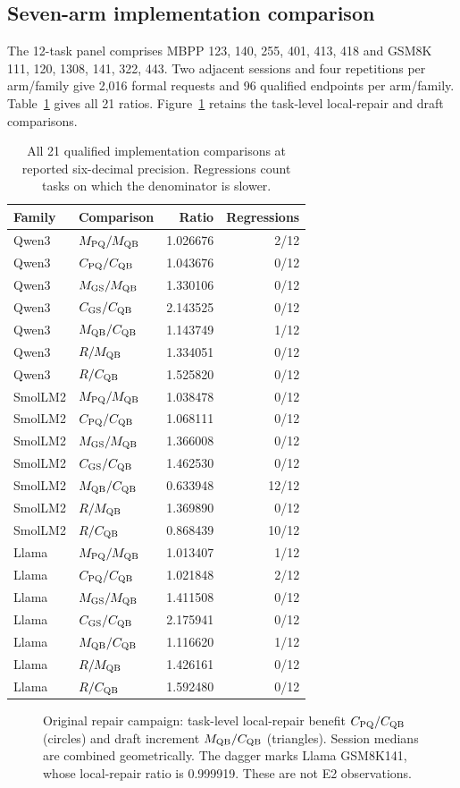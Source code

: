 \subsection{Seven-arm implementation comparison}
The 12-task panel comprises MBPP 123, 140, 255, 401, 413, 418 and GSM8K 111, 120, 1308, 141, 322, 443. Two adjacent sessions and four repetitions per arm/family give 2,016 formal requests and 96 qualified endpoints per arm/family. Table~\ref{tab:allcost} gives all 21 ratios. Figure~\ref{fig:taskcost} retains the task-level local-repair and draft comparisons.
\begin{table}[t]\centering\small
\caption{All 21 qualified implementation comparisons at reported six-decimal precision. Regressions count tasks on which the denominator is slower.}
\label{tab:allcost}
\begin{tabular}{@{}llrr@{}}\toprule
Family&Comparison&Ratio&Regressions\\\midrule
Qwen3 & $M_{\mathrm{PQ}}/M_{\mathrm{QB}}$ & 1.026676 & 2/12 \\
Qwen3 & $C_{\mathrm{PQ}}/C_{\mathrm{QB}}$ & 1.043676 & 0/12 \\
Qwen3 & $M_{\mathrm{GS}}/M_{\mathrm{QB}}$ & 1.330106 & 0/12 \\
Qwen3 & $C_{\mathrm{GS}}/C_{\mathrm{QB}}$ & 2.143525 & 0/12 \\
Qwen3 & $M_{\mathrm{QB}}/C_{\mathrm{QB}}$ & 1.143749 & 1/12 \\
Qwen3 & $R/M_{\mathrm{QB}}$ & 1.334051 & 0/12 \\
Qwen3 & $R/C_{\mathrm{QB}}$ & 1.525820 & 0/12 \\
SmolLM2 & $M_{\mathrm{PQ}}/M_{\mathrm{QB}}$ & 1.038478 & 0/12 \\
SmolLM2 & $C_{\mathrm{PQ}}/C_{\mathrm{QB}}$ & 1.068111 & 0/12 \\
SmolLM2 & $M_{\mathrm{GS}}/M_{\mathrm{QB}}$ & 1.366008 & 0/12 \\
SmolLM2 & $C_{\mathrm{GS}}/C_{\mathrm{QB}}$ & 1.462530 & 0/12 \\
SmolLM2 & $M_{\mathrm{QB}}/C_{\mathrm{QB}}$ & 0.633948 & 12/12 \\
SmolLM2 & $R/M_{\mathrm{QB}}$ & 1.369890 & 0/12 \\
SmolLM2 & $R/C_{\mathrm{QB}}$ & 0.868439 & 10/12 \\
Llama & $M_{\mathrm{PQ}}/M_{\mathrm{QB}}$ & 1.013407 & 1/12 \\
Llama & $C_{\mathrm{PQ}}/C_{\mathrm{QB}}$ & 1.021848 & 2/12 \\
Llama & $M_{\mathrm{GS}}/M_{\mathrm{QB}}$ & 1.411508 & 0/12 \\
Llama & $C_{\mathrm{GS}}/C_{\mathrm{QB}}$ & 2.175941 & 0/12 \\
Llama & $M_{\mathrm{QB}}/C_{\mathrm{QB}}$ & 1.116620 & 1/12 \\
Llama & $R/M_{\mathrm{QB}}$ & 1.426161 & 0/12 \\
Llama & $R/C_{\mathrm{QB}}$ & 1.592480 & 0/12 \\
\bottomrule\end{tabular}
\end{table}
\begin{figure}[t]\centering
\caption{Original repair campaign: task-level local-repair benefit $C_{\mathrm{PQ}}/C_{\mathrm{QB}}$ (circles) and draft increment $M_{\mathrm{QB}}/C_{\mathrm{QB}}$ (triangles). Session medians are combined geometrically. The dagger marks Llama GSM8K141, whose local-repair ratio is 0.999919. These are not E2 observations.}
\label{fig:taskcost}\end{figure}

